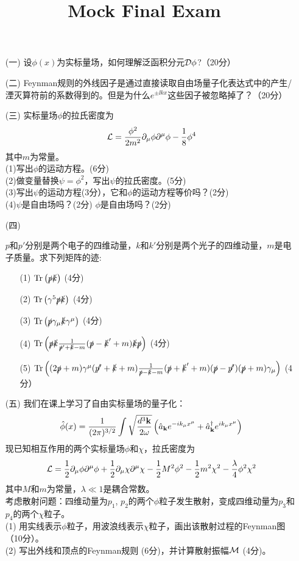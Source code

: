 \documentclass[CJK]{article}
\title{Mock Final Exam}
\author{}
\date{}
\begin{document}
\maketitle
\bch
\begin{itemize}
\item[(一)]{设$\phi(x)$为实标量场，如何理解泛函积分元${\mathcal{D}}\phi$?（20分）
}
\item[(二)]{Feynman规则的外线因子是通过直接读取自由场量子化表达式中的产生/湮灭算符前的系数得到的。但是为什么$e^{\pm \ii kx}$这些因子被忽略掉了？（20分）
}
\item[(三)]{实标量场$\phi$的拉氏密度为
$${\mathcal{L}} = \frac{\phi^2}{2m^2} \partial_\mu\phi\partial^\mu\phi - \frac{1}{8}\phi^4 $$
其中$m$为常量。\\
(1)写出$\phi$的运动方程。(6分)\\
(2)做变量替换$\psi = \phi^2$，写出$\psi$的拉氏密度。(5分)\\
(3)写出$\psi$的运动方程(3分），它和$\phi$的运动方程等价吗？(2分)\\
(4)$\psi$是自由场吗？(2分) $\phi$是自由场吗？(2分)
}
\item[(四)]{$p$和$p'$分别是两个电子的四维动量，$k$和$k'$分别是两个光子的四维动量，$m$是电子质量。求下列矩阵的迹:
\begin{itemize}
\item[(1)]{$\mathrm{Tr}\left(\slashed{p}\slashed{k}\right)$ (4分)}
\item[(2)]{$\mathrm{Tr}\left(\gamma^5\slashed{p}\slashed{k}\right)$ (4分)}
\item[(3)]{$\mathrm{Tr}\left(\slashed{p}\gamma_\mu\slashed{k}\gamma^\mu\right)$ (4分)}
\item[(4)]{$\mathrm{Tr}\left(\slashed{p}\slashed{k}\frac{1}{\slashed{p}'+\slashed{k}-m}(\slashed{p}-\slashed{k}'+m)\slashed{k}\slashed{p}\right)$ (4分)}
\item[(5)]{$\mathrm{Tr}\left((2\slashed{p}+m)\gamma^\mu(\slashed{p'}+\slashed{k}+m)\frac{1}{\slashed{p}-\slashed{k}-m}(\slashed{p}+\slashed{k}'+m)(\slashed{p}-\slashed{p'})(\slashed{p}+m)\gamma_\mu\right)$ (4分）}
\end{itemize}
}
\item[(五)]{
我们在课上学习了自由实标量场的量子化：
$${\hat{\phi}}(x) = \frac{1}{(2\pi)^{3/2}} \int \sqrt{\frac{d^3{\mathbf{k}}}{2\omega}} \left({\hat{a}}_{{\mathbf{k}}} e^{-ik_\mu x^\mu} + {\hat{a}^\dagger}_{{\mathbf{k}}}e^{ik_\mu x^\mu}\right) $$
现已知相互作用的两个实标量场$\phi$和$\chi$，拉氏密度为
$${\mathcal{L}} = \frac{1}{2}\partial_\mu\phi\partial^\mu\phi + \frac{1}{2}\partial_\mu\chi\partial^\mu\chi - \frac{1}{2} M^2\phi^2 - \frac{1}{2} m^2\chi^2 -\frac{\lambda}{4} \phi^2\chi^2 $$
其中$M$和$m$为常量，$\lambda\ll 1$是耦合常数。\\
考虑散射问题：四维动量为$p_1$, $p_2$的两个$\phi$粒子发生散射，变成四维动量为$p_3$和$p_4$的两个$\chi$粒子。 \\
(1) 用实线表示$\phi$粒子，用波浪线表示$\chi$粒子，画出该散射过程的Feynman图 （10分）。\\
(2) 写出外线和顶点的Feynman规则 (6分)，并计算散射振幅${\mathcal{M}}$ (4分)。
}
\end{itemize}
\ech
\end{document}
